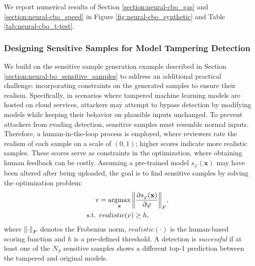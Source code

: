 \noindent We report numerical results of Section \ref{section:neural-cbo_gas} and  \ref{section:neural-cbo_speed} in Figure \ref{fig:neural-cbo_synthetic} and Table \ref{tab:neural-cbo_t-test}.
\subsubsection{Designing Sensitive Samples for Model Tampering Detection}
\label{section:neural-cbo_sensitive_sample}


We build on the sensitive sample generation example described in Section \ref{section:neural-bo_sensitive_samples} to address an additional practical challenge: incorporating constraints on the generated samples to ensure their realism. Specifically, in scenarios where tampered machine learning models are hosted on cloud services, attackers may attempt to bypass detection by modifying models while keeping their behavior on plausible inputs unchanged. To prevent attackers from evading detection, sensitive samples must resemble normal inputs. Therefore, a human-in-the-loop process is employed, where reviewers rate the realism of each sample on a scale of $(0,1)$; higher scores indicate more realistic samples. These scores serve as constraints in the optimization, where obtaining human feedback can be costly. Assuming a pre-trained model $s_\varphi(\mathbf{x})$ may have been altered after being uploaded, the goal is to find sensitive samples by solving the optimization problem: 
\begin{align*}
    v &= \operatorname*{argmax}_\mathbf{x} \norm{\frac{\partial s_\varphi(\mathbf{x})}{\partial \varphi}}_F, 
    \\
    \text{s.t. } &  realistic(v) \ge h, 
\end{align*}
where $\norm{\cdot}_F$ denotes the Frobenius norm, $realistic(\cdot)$ is the human-based scoring function and $h$ is a pre-defined threshold. A detection is \emph{successful} if at least one of the $N_S$ sensitive samples shows a different top-1 prediction between the tampered and original models.  

